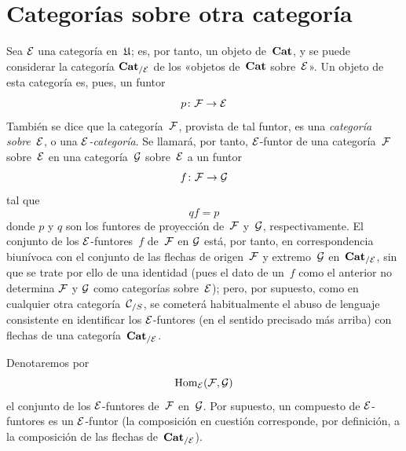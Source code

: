 \section{Categorías sobre otra categoría}
\label{VI.2}

Sea $\cal{E}$ una categoría en~$\Univ$; es, por tanto, un objeto de~$\Cat$, y
se puede considerar la categoría
$\Cat_{/\cal{E}}$
\label{indnot:fh}%
de los «objetos de~$\Cat$ sobre~$\cal{E}$». Un objeto de esta categoría es,
pues, un funtor
$$
p\colon \cal{F}\to\cal{E}
$$
También se dice que la categoría~$\cal{F}$, provista de tal funtor, es una
\emph{categoría sobre}~$\cal{E}$, o una $\cal{E}$\emph{-categoría}. Se llamará,
por tanto, $\cal{E}$-funtor de una categoría~$\cal{F}$ sobre~$\cal{E}$ en una
categoría~$\cal{G}$ sobre~$\cal{E}$ a un funtor
$$
f\colon\cal{F}\to\cal{G}
$$
tal que
$$
qf=p
$$
donde $p$ y $q$ son los funtores de proyección de~$\cal{F}$ y~$\cal{G}$,
respectivamente. El conjunto de los $\cal{E}$-funtores~$f$ de~$\cal{F}$ en
$\cal{G}$ está, por tanto, en correspondencia biunívoca con el conjunto de las
flechas de origen~$\cal{F}$ y extremo~$\cal{G}$ en~$\Cat_{/\cal{E}}$, sin
que se trate por ello de una identidad (pues el dato de un~$f$ como el anterior
no determina $\cal{F}$ y $\cal{G}$ como categorías sobre~$\cal{E}$); pero, por
supuesto, como en cualquier otra categoría~$\cal{C}_{/S}$, se cometerá
habitualmente el abuso de lenguaje consistente en identificar los
$\cal{E}$-funtores (en el sentido precisado más arriba) con flechas de una
categoría~$\Cat_{/\cal{E}}$.

Denotaremos por
$$
\Hom_{\cal{E}}(\cal{F},\cal{G})
$$
el conjunto de los $\cal{E}$-funtores de~$\cal{F}$ en~$\cal{G}$. Por supuesto,
un compuesto de $\cal{E}$-funtores es un $\cal{E}$-funtor (la composición en
cuestión corresponde, por definición, a la composición de las flechas
de~$\Cat_{/\cal{E}}$).

